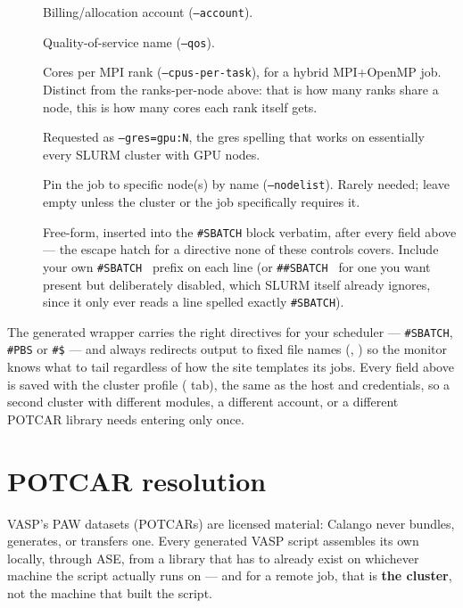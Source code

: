 \begin{description}
  \item[] Billing/allocation account (\texttt{--account}).
  \item[] Quality-of-service name (\texttt{--qos}).
  \item[] Cores per MPI rank (\texttt{--cpus-per-task}), for a
    hybrid MPI+OpenMP job. Distinct from the ranks-per-node above: that is
    how many ranks share a node, this is how many cores each rank itself
    gets.
  \item[] Requested as \texttt{--gres=gpu:N}, the gres
    spelling that works on essentially every SLURM cluster with GPU nodes.
  \item[] Pin the job to specific node(s) by name
    (\texttt{--nodelist}). Rarely needed; leave empty unless the cluster or
    the job specifically requires it.
  \item[] Free-form, inserted into the
    \texttt{\#SBATCH} block verbatim, after every field above --- the
    escape hatch for a directive none of these controls covers. Include
    your own \texttt{\#SBATCH } prefix on each line (or \texttt{\#\#SBATCH
    } for one you want present but deliberately disabled, which SLURM
    itself already ignores, since it only ever reads a line spelled
    exactly \texttt{\#SBATCH}).
\end{description}

The generated wrapper carries the right directives for your scheduler ---
\texttt{\#SBATCH}, \texttt{\#PBS} or \texttt{\#\$} --- and always redirects
output to fixed file names (, )
so the monitor knows what to tail regardless of how the site templates its
jobs. Every field above is saved with the cluster profile (
tab), the same as the host and credentials, so a second cluster with
different modules, a different account, or a different POTCAR library needs
entering only once.

\section{POTCAR resolution}
\label{sec:potcar-resolution}

VASP's PAW datasets (POTCARs) are licensed material: Calango never bundles,
generates, or transfers one. Every generated VASP script assembles its own
 locally, through ASE, from a library that has to already
exist on whichever machine the script actually runs on --- and for a
remote job, that is \textbf{the cluster}, not the machine that built the
script.

